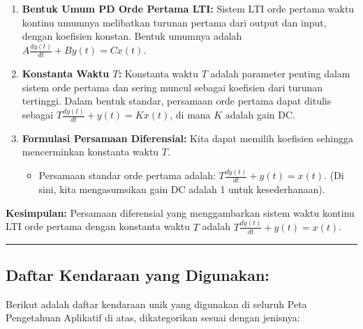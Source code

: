 \documentclass[
  letterpaper,
  DIV=11,
  numbers=noendperiod]{scrreprt}
\providecommand{\tightlist}{%
  \setlength{\itemsep}{0pt}\setlength{\parskip}{0pt}}
\begin{document}
\begin{enumerate}
\def\labelenumi{\arabic{enumi}.}
\tightlist
\item
  \textbf{Bentuk Umum PD Orde Pertama LTI:} Sistem LTI orde pertama
  waktu kontinu umumnya melibatkan turunan pertama dari output dan
  input, dengan koefisien konstan. Bentuk umumnya adalah
  \(A \frac{dy(t)}{dt} + B y(t) = C x(t)\).
\item
  \textbf{Konstanta Waktu \(T\):} Konstanta waktu \(T\) adalah parameter
  penting dalam sistem orde pertama dan sering muncul sebagai koefisien
  dari turunan tertinggi. Dalam bentuk standar, persamaan orde pertama
  dapat ditulis sebagai \(T \frac{dy(t)}{dt} + y(t) = K x(t)\), di mana
  \(K\) adalah gain DC.
\item
  \textbf{Formulasi Persamaan Diferensial:} Kita dapat memilih koefisien
  sehingga mencerminkan konstanta waktu \(T\).

  \begin{itemize}
  \tightlist
  \item
    Persamaan standar orde pertama adalah:
    \(T \frac{dy(t)}{dt} + y(t) = x(t)\). (Di sini, kita mengasumsikan
    gain DC adalah 1 untuk kesederhanaan).
  \end{itemize}
\end{enumerate}

\textbf{Kesimpulan:} Persamaan diferensial yang menggambarkan sistem
waktu kontinu LTI orde pertama dengan konstanta waktu \(T\) adalah
\textbf{\(T \frac{dy(t)}{dt} + y(t) = x(t)\)}.

\begin{center}\rule{0.5\linewidth}{0.5pt}\end{center}

\subsection{Daftar Kendaraan yang
Digunakan:}\label{daftar-kendaraan-yang-digunakan}

Berikut adalah daftar kendaraan unik yang digunakan di seluruh Peta
Pengetahuan Aplikatif di atas, dikategorikan sesuai dengan jenisnya:
\end{document}

